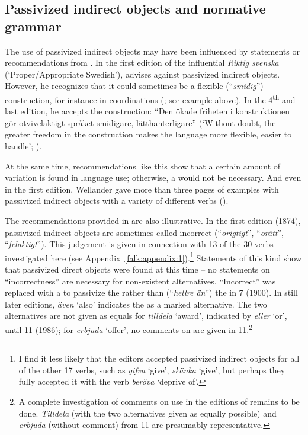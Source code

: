 \documentclass[output=paper]{langscibook}
\begin{document}
\subsection{Passivized indirect objects and normative grammar}\label{sec:falk:3.6}


The use of passivized indirect objects may have been influenced by statements or recommendations from . In the first edition of the influential \textit{Riktig svenska} (‘Proper/Appropriate Swedish’), \citet{Wellander1939} advises against passivized indirect objects. However, he recognizes that it could sometimes be a flexible (“\textit{smidig}”) construction, for instance in coordinations (\citeyear[291]{Wellander1939}; see example  above). In the 4\textsuperscript{th} and last edition, he accepts the construction: “Den ökade friheten i konstruktionen gör otvivelaktigt språket smidigare, lätthanterligare” (‘Without doubt, the greater freedom in the construction makes the language more flexible, easier to handle’; \citeyear[148–149]{Wellander1973}).


At the same time, recommendations like this show that a certain amount of variation is found in language use; otherwise, a  would not be necessary. And even in the first edition, Wellander gave more than three pages of examples with passivized indirect objects with a variety of different verbs (\citeyear[297–301]{Wellander1939}).  



The recommendations provided in  are also illustrative. In the first edition (1874), passivized indirect objects are sometimes called incorrect (“\textit{origtigt}”, “\textit{orätt}”, “\textit{felaktigt}”). This judgement is given in connection with 13 of the 30 verbs investigated here (see Appendix~\ref{falk:appendix:1}).\footnote{I find it less likely that the editors accepted passivized indirect objects for all of the other 17 verbs, such as \textit{gifva} ‘give’, \textit{skänka} ‘give’, but perhaps they fully accepted it with the verb \textit{beröva} ‘deprive of’.} Statements of this kind show that passivized direct objects were found at this time – no statements on “incorrectness” are necessary for non-existent alternatives. “Incorrect” was replaced with a  to passivize the  rather than (“\textit{hellre än}”) the  in  7 (1900). In still later editions, \textit{även} ‘also’ indicates the  as a marked alternative. The two alternatives are not given as equals for \textit{tilldela} ‘award’, indicated by \textit{eller} ‘or’, until  11 (1986); for \textit{erbjuda} ‘offer’, no comments on  are given in  11.\footnote{A complete investigation of comments on use in the editions of  remains to be done. \textit{Tilldela} (with the two alternatives given as equally possible) and \textit{erbjuda} (without comment) from  11 are presumably representative.}
\end{document}
